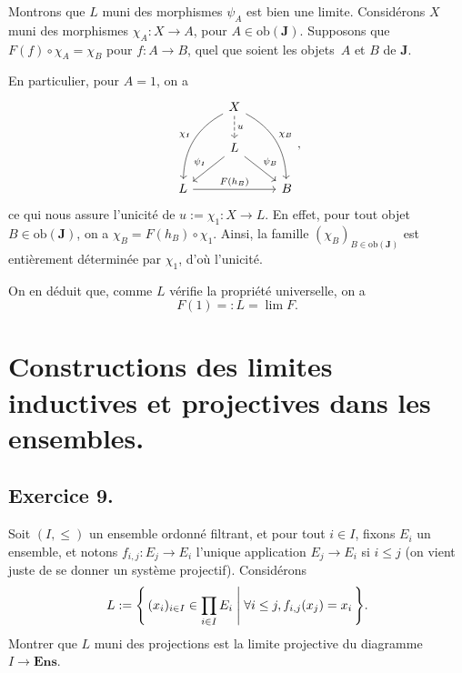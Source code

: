 \documentclass{../../td}
\let\bm\boldsymbol
\begin{document}
  Montrons que $L$ muni des morphismes $\psi_A$ est bien une limite.
  Considérons $X$ muni des morphismes $\chi_A : X \to A$, pour $A \in \mathrm{ob}(\mathbf{J})$.
  Supposons que $F(f)\circ \chi_A = \chi_B$ pour $f : A \to B$, quel que soient les objets~$A$ et $B$ de $\mathbf{J}$. 

  En particulier, pour $A = \bm{\mathit{1}}$, on a \[
    \begin{tikzcd}
      & X \arrow[bend right,swap]{ddl}{\chi_{\bm{\mathit{1}}}} \arrow[bend left]{ddr}{\chi_B} \arrow[dashed]{d}{u}\\
      & L\arrow[swap]{dl}{\psi_{\bm{\mathit{1}}}} \arrow{dr}{\psi_B}\\
      L\arrow{rr}{F(h_B)} & & B
    \end{tikzcd}
  ,\]
  ce qui nous assure l'unicité de $u := \chi_{\bm{\mathit{1}}} : X \to L$.
  En effet, pour tout objet $B \in \mathrm{ob}(\mathbf{J})$, on a $\chi_B = F(h_B) \circ \chi_{\bm{\mathit{1}}}$.
  Ainsi, la famille $(\chi_B)_{B \in \mathrm{ob}(\mathbf{J})}$ est entièrement déterminée par $\chi_{\bm{\mathit{1}}}$, d'où l'unicité.

  On en déduit que, comme $L$ vérifie la propriété universelle, on a \[
    F(\bm{\mathit{1}}) =: L = \lim F
  .\] 



  \part{Constructions des limites inductives et projectives dans les ensembles.}
  \chapter{Exercice 9.}\label{exo-9}

  \begin{slshape}
    \color{deepblue}
    Soit $(I, \le )$ un ensemble ordonné filtrant, et pour tout $i \in I$, fixons $E_i$ un ensemble, et notons $f_{i,j} : E_j \to E_i$ l'unique application $E_j \to E_i$ si $i \le j$ (on vient juste de se donner un système projectif).
    Considérons \[
    L := \mleft\{\, (x_i)_{i \in I} \in \prod_{i \in I} E_i \;\middle|\; \forall i \le j, f_{i,j}(x_j) = x_i\,\mright\} 
    .\] 
    Montrer que $L$ muni des projections est la limite projective du diagramme $I \to \mathbf{Ens}$.
  \end{slshape}


  
\end{document}
